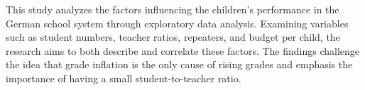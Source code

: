 
This study analyzes the factors influencing the children's performance in the German school system through exploratory data analysis. Examining variables such as student numbers, teacher ratios, repeaters, and budget per child, the research aims to both describe and correlate these factors. The findings challenge the idea that grade inflation is the only cause of rising grades and emphasis the importance of having a small student-to-teacher ratio.